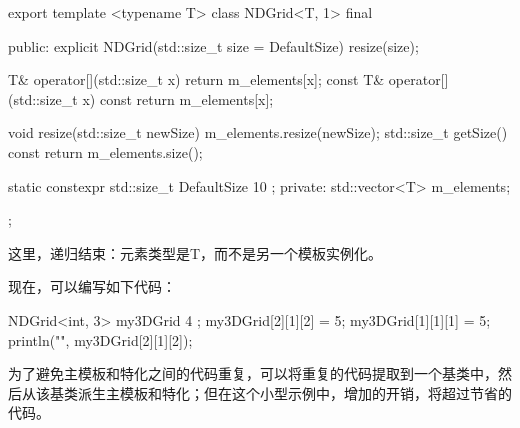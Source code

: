 \begin{cpp}
export template <typename T>
class NDGrid<T, 1> final
{
    public:
        explicit NDGrid(std::size_t size = DefaultSize) { resize(size); }

        T& operator[](std::size_t x) { return m_elements[x]; }
        const T& operator[](std::size_t x) const { return m_elements[x]; }

        void resize(std::size_t newSize) { m_elements.resize(newSize); }
        std::size_t getSize() const { return m_elements.size(); }

        static constexpr std::size_t DefaultSize { 10 };
    private:
        std::vector<T> m_elements;
};
\end{cpp}

这里，递归结束：元素类型是T，而不是另一个模板实例化。

现在，可以编写如下代码：

\begin{cpp}
NDGrid<int, 3> my3DGrid { 4 };
my3DGrid[2][1][2] = 5;
my3DGrid[1][1][1] = 5;
println("{}", my3DGrid[2][1][2]);
\end{cpp}

为了避免主模板和特化之间的代码重复，可以将重复的代码提取到一个基类中，然后从该基类派生主模板和特化；但在这个小型示例中，增加的开销，将超过节省的代码。













